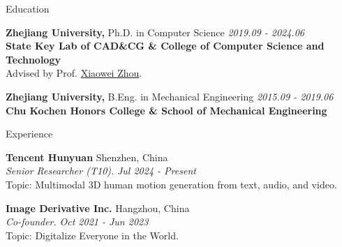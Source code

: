 \documentclass{resume}
\begin{document}
\begin{rSection}{Education}

    {\bf Zhejiang University, } Ph.D. in Computer Science \hfill {\em 2019.09 - 2024.06}
    {\bf \\State Key Lab of CAD\&CG \& College of Computer Science and Technology}
    \\ Advised by Prof. \href{https://xzhou.me}{Xiaowei Zhou}.

    {\bf Zhejiang University, } B.Eng. in Mechanical Engineering \hfill {\em 2015.09 - 2019.06}
    {\bf \\Chu Kochen Honors College \& School of Mechanical Engineering}

\end{rSection}

\begin{rSection}{Experience}

    {\bf Tencent Hunyuan} \hfill Shenzhen, China \\
    {\em Senior Researcher (T10).} \hfill {\em Jul 2024 - Present} \\
    Topic: Multimodal 3D human motion generation from text, audio, and video.

    {\bf Image Derivative Inc.} \hfill Hangzhou, China \\
    {\em Co-founder.} \hfill {\em Oct 2021 - Jun 2023} \\
    Topic: Digitalize Everyone in the World.

\end{rSection}
\end{document}
